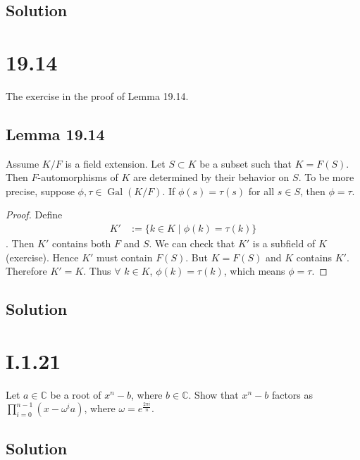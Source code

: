 \documentclass[fleqn]{article}
\DeclareMathOperator{\Gal}{Gal}
\begin{document}
        \subsection{Solution}
        
    
    \section{19.14}
    The exercise in the proof of Lemma 19.14.
        
        \subsection{Lemma 19.14}
        Assume $K/F$ is a field extension.  Let $S \subset K$ be a subset such that $K = F(S)$.  Then $F$-automorphisms of $K$ are determined by their behavior on $S$.  To be more precise, suppose $\phi, \tau \in \Gal(K/F)$.  If $\phi(s) = \tau(s)$ for all $s \in S$, then $\phi = \tau$.
        
        \begin{proof}
            Define
            \begin{align}
                K' &:= \{k \in K \mid \phi(k) = \tau(k)\}
            \end{align}.
            Then $K'$ contains both $F$ and $S$.  We can check that $K'$ is a subfield of $K$ (exercise).  Hence $K'$ must contain $F(S)$.  But $K = F(S)$ and $K$ contains $K'$.  Therefore $K' = K$.  Thus $\forall$ $k \in K$, $\phi(k) = \tau(k)$, which means $\phi = \tau$.
        \end{proof}
        
        \subsection{Solution}
        
    
    \section{I.1.21}
    Let $a \in \mathbb{C}$ be a root of $x^n - b$, where $b \in \mathbb{C}$.  Show that $x^n - b$ factors as $\prod\limits_{i = 0}^{n - 1} (x - \omega^i a)$, where $\omega = e^{\frac{2 \pi i}{n}}$.
        
        \subsection{Solution}
        
\end{document}
